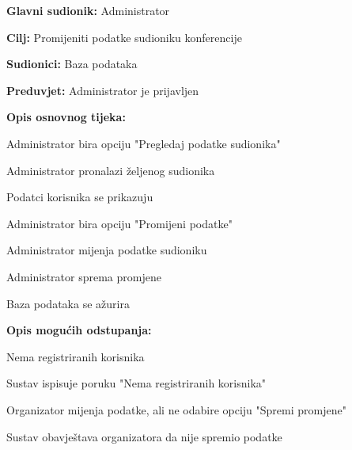 	\noindent {}
	\begin{packed_item}
		
		\item \textbf{Glavni sudionik: }Administrator
		\item  \textbf{Cilj:} Promijeniti podatke sudioniku konferencije
		\item  \textbf{Sudionici:} Baza podataka
		\item  \textbf{Preduvjet:} Administrator je prijavljen
		\item  \textbf{Opis osnovnog tijeka:}
		
		\item[] \begin{packed_enum}
			
			\item Administrator bira opciju "Pregledaj podatke sudionika"
			\item Administrator pronalazi željenog sudionika
			\item Podatci korisnika se prikazuju
			\item Administrator bira opciju "Promijeni podatke"
			\item Administrator mijenja podatke sudioniku
			\item Administrator sprema promjene
			\item Baza podataka se ažurira
			
		\end{packed_enum}
		
		\item  \textbf{Opis mogućih odstupanja:}
		
		\item[] \begin{packed_item}
			
			\item[1.a] Nema registriranih korisnika
			\item[] \begin{packed_enum}
				\item Sustav ispisuje poruku "Nema registriranih korisnika"
				
			\end{packed_enum}
		
			\item[5.a] Organizator mijenja podatke, ali ne odabire opciju "Spremi promjene"
			\item[] \begin{packed_enum}
				\item Sustav obavještava organizatora da nije spremio podatke
				
			\end{packed_enum}
		\end{packed_item}
	\end{packed_item}

